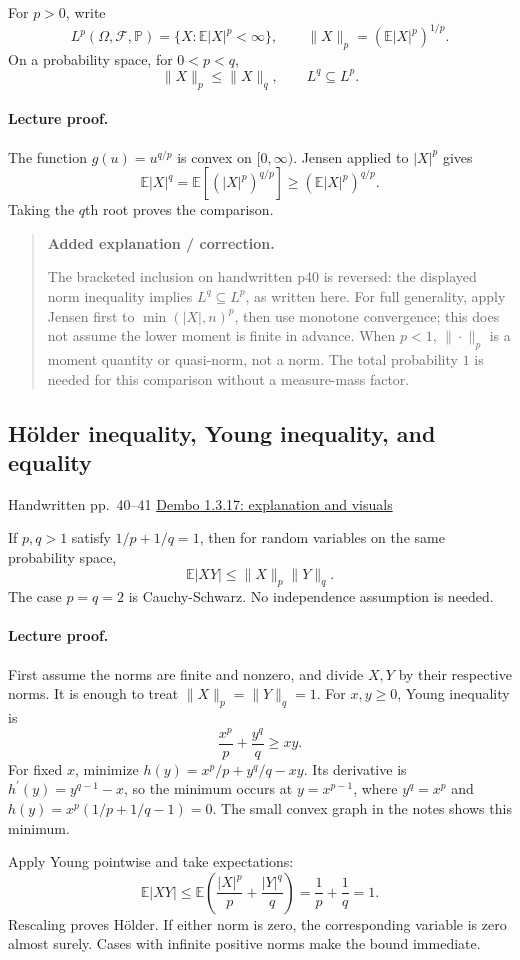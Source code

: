 \documentclass[11pt,letterpaper]{article}
\newcommand{\lecturesection}[1]{\subsection{#1}}
\begin{document}
For $p>0$, write \[L^p(\Omega,\mathcal F,\mathbb P)=\{X:\mathbb E|X|^p<\infty\},\qquad \|X\|_p=(\mathbb E|X|^p)^{1/p}.\] On a probability space, for $0<p<q$, \[\|X\|_p\le\|X\|_q,\qquad L^q\subseteq L^p.\]

\paragraph{Lecture proof.}
The function $g(u)=u^{q/p}$ is convex on $[0,\infty)$. Jensen applied to $|X|^p$ gives \[\mathbb E|X|^q=\mathbb E[(|X|^p)^{q/p}]\ge(\mathbb E|X|^p)^{q/p}.\] Taking the $q$th root proves the comparison.

\begin{quote}\small\textbf{Added explanation / correction.}

The bracketed inclusion on handwritten p40 is reversed: the displayed norm inequality implies $L^q\subseteq L^p$, as written here. For full generality, apply Jensen first to $\min(|X|,n)^p$, then use monotone convergence; this does not assume the lower moment is finite in advance. When $p<1$, $\|\cdot\|_p$ is a moment quantity or quasi-norm, not a norm. The total probability $1$ is needed for this comparison without a measure-mass factor.
\end{quote}

\hypertarget{l5-s5}{}
\lecturesection{Hölder inequality, Young inequality, and equality}
{\small\textcolor{lectureink}{Handwritten pp.\ 40--41} \quad \href{https://josephrbailey.com/probability/\#entry-1-3-17}{Dembo 1.3.17: explanation and visuals}}

If $p,q>1$ satisfy $1/p+1/q=1$, then for random variables on the same probability space, \[\mathbb E|XY|\le\|X\|_p\|Y\|_q.\] The case $p=q=2$ is Cauchy-Schwarz. No independence assumption is needed.

\paragraph{Lecture proof.}
First assume the norms are finite and nonzero, and divide $X,Y$ by their respective norms. It is enough to treat $\|X\|_p=\|Y\|_q=1$. For $x,y\ge0$, Young inequality is \[\frac{x^p}{p}+\frac{y^q}{q}\ge xy.\] For fixed $x$, minimize $h(y)=x^p/p+y^q/q-xy$. Its derivative is $h^{\prime}(y)=y^{q-1}-x$, so the minimum occurs at $y=x^{p-1}$, where $y^q=x^p$ and $h(y)=x^p(1/p+1/q-1)=0$. The small convex graph in the notes shows this minimum.

Apply Young pointwise and take expectations: \[\mathbb E|XY|\le\mathbb E\left(\frac{|X|^p}{p}+\frac{|Y|^q}{q}\right)=\frac1p+\frac1q=1.\] Rescaling proves Hölder. If either norm is zero, the corresponding variable is zero almost surely. Cases with infinite positive norms make the bound immediate.
\end{document}
